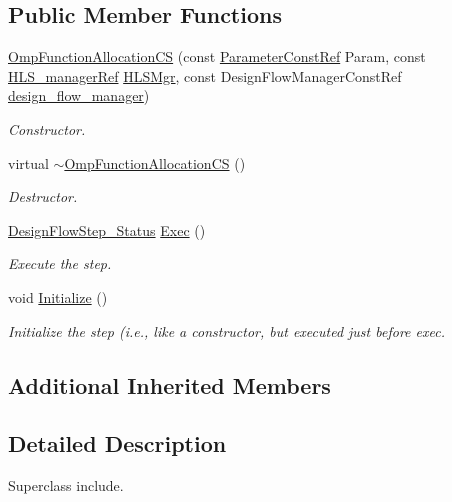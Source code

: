 \subsection*{Public Member Functions}
\begin{DoxyCompactItemize}
\item 
\hyperlink{classOmpFunctionAllocationCS_aad5b0328f317d0506cd2d098f1c5727c}{Omp\+Function\+Allocation\+CS} (const \hyperlink{Parameter_8hpp_a37841774a6fcb479b597fdf8955eb4ea}{Parameter\+Const\+Ref} Param, const \hyperlink{hls__manager_8hpp_acd3842b8589fe52c08fc0b2fcc813bfe}{H\+L\+S\+\_\+manager\+Ref} \hyperlink{classHLS__step_ade85003a99d34134418451ddc46a18e9}{H\+L\+S\+Mgr}, const Design\+Flow\+Manager\+Const\+Ref \hyperlink{classDesignFlowStep_ab770677ddf087613add30024e16a5554}{design\+\_\+flow\+\_\+manager})
\begin{DoxyCompactList}\small\item\em Constructor. \end{DoxyCompactList}\item 
virtual \hyperlink{classOmpFunctionAllocationCS_a0204f54d5cac78855968461a6e0f5330}{$\sim$\+Omp\+Function\+Allocation\+CS} ()
\begin{DoxyCompactList}\small\item\em Destructor. \end{DoxyCompactList}\item 
\hyperlink{design__flow__step_8hpp_afb1f0d73069c26076b8d31dbc8ebecdf}{Design\+Flow\+Step\+\_\+\+Status} \hyperlink{classOmpFunctionAllocationCS_a2a5a5321bfaefebcca2c4f290bb0d808}{Exec} ()
\begin{DoxyCompactList}\small\item\em Execute the step. \end{DoxyCompactList}\item 
void \hyperlink{classOmpFunctionAllocationCS_a6c97b4f87a09796aa43a387460348315}{Initialize} ()
\begin{DoxyCompactList}\small\item\em Initialize the step (i.\+e., like a constructor, but executed just before exec. \end{DoxyCompactList}\end{DoxyCompactItemize}
\subsection*{Additional Inherited Members}


\subsection{Detailed Description}
Superclass include. 

